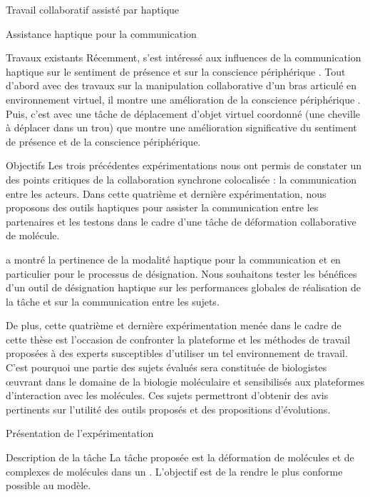 \documentclass[myfrancais,ngerman,english,french]{mythesis}
\begin{document}
\begin{mychapter}{Travail collaboratif assisté par haptique}
\begin{mysection}{Assistance haptique pour la communication}
\begin{mysubsection}{Travaux existants}
				Récemment,  s'est intéressé aux influences de la communication haptique sur le sentiment de présence et sur la conscience périphérique .
				Tout d'abord avec des travaux sur la manipulation collaborative d'un bras articulé en environnement virtuel, il montre une amélioration de la conscience périphérique .
				Puis, c'est avec une tâche de déplacement d'objet virtuel coordonné (une cheville à déplacer dans un trou) que  montre une amélioration significative du sentiment de présence et de la conscience périphérique.
			\end{mysubsection}
			\begin{mysubsection}{Objectifs}
				Les trois précédentes expérimentations nous ont permis de constater un des points critiques de la collaboration synchrone colocalisée : la communication entre les acteurs.
				Dans cette quatrième et dernière expérimentation, nous proposons des outils haptiques pour assister la communication entre les partenaires et les testons dans le cadre d'une tâche de déformation collaborative de molécule.

				 a montré la pertinence de la modalité haptique pour la communication et en particulier pour le processus de désignation.
				Nous souhaitons tester les bénéfices d'un outil de désignation haptique sur les performances globales de réalisation de la tâche et sur la communication entre les sujets.

				De plus, cette quatrième et dernière expérimentation menée dans le cadre de cette thèse est l'occasion de confronter la plateforme et les méthodes de travail proposées à des experts susceptibles d'utiliser un tel environnement de travail.
				C'est pourquoi une partie des sujets évalués sera constituée de biologistes œuvrant dans le domaine de la biologie moléculaire et sensibilisés aux plateformes d'interaction avec les molécules.
				Ces sujets permettront d'obtenir des avis pertinents sur l'utilité des outils proposés et des propositions d'évolutions.
			\end{mysubsection}
		\end{mysection}
		\begin{mysection}{Présentation de l'expérimentation}
			\begin{mysubsection}{Description de la tâche}
				La tâche proposée est la déformation de molécules et de complexes de molécules dans un .
				L'objectif est de la rendre le plus conforme possible au modèle.


\end{mysubsection}
\end{mysection}
\end{mychapter}
\end{document}
